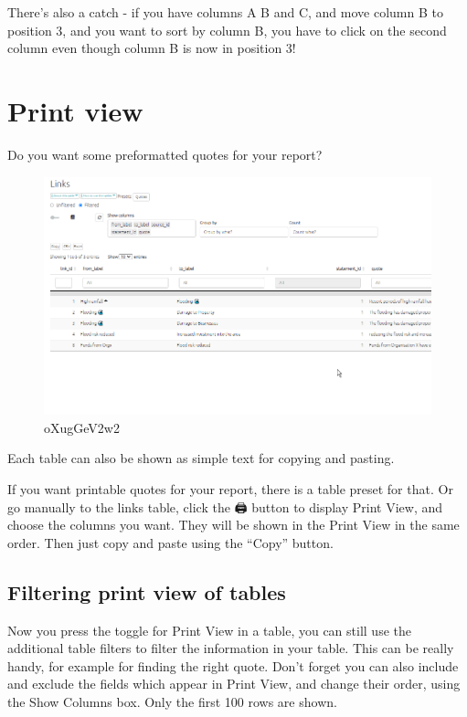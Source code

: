 \documentclass[
]{book}
\begin{document}
There's also a catch - if you have columns A B and C, and move column B to position 3, and you want to sort by column B, you have to click on the second column even though column B is now in position 3!

\hypertarget{xprint-view-tables-old}{%
\section{Print view}\label{xprint-view-tables-old}}

Do you want some preformatted quotes for your report?

\begin{figure}
\centering
\includegraphics{_assets/oXugGeV2w2.gif}
\caption{oXugGeV2w2}
\end{figure}

Each table can also be shown as simple text for copying and pasting.

If you want printable quotes for your report, there is a table preset for that. Or go manually to the links table, click the 🖨️ button to display Print View, and choose the columns you want. They will be shown in the Print View in the same order. Then just copy and paste using the ``Copy'' button.

\hypertarget{filtering-print-view-of-tables}{%
\subsection{Filtering print view of tables}\label{filtering-print-view-of-tables}}

Now you press the toggle for Print View in a table, you can still use the additional table filters to filter the information in your table. This can be really handy, for example for finding the right quote. Don't forget you can also include and exclude the fields which appear in Print View, and change their order, using the Show Columns box. Only the first 100 rows are shown.
\end{document}
